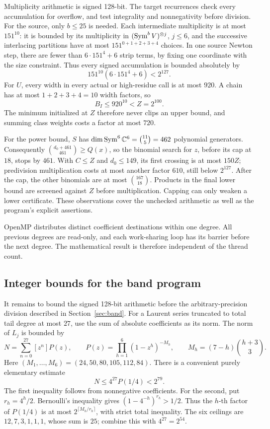 Multiplicity arithmetic is signed 128-bit. The target recurrences check
every accumulation for overflow, and test integrality and nonnegativity
before division. For the source, only \(b\le25\) is needed.
Each intermediate multiplicity is at most \(151^{10}\): it is bounded
by its multiplicity in \((\operatorname{Sym}^b V)^{\otimes j}\), \(j\le6\), and the
successive interlacing partitions have at most
\(151^{0+1+2+3+4}\) choices. In one source Newton step, there are fewer
than \(6\cdot151^4+6\) strip terms, by fixing one coordinate with the
size constraint. Thus every signed accumulation is bounded absolutely by
\[
                   151^{10}(6\cdot151^4+6)<2^{127}.
\]
For \(U\), every width in every actual or high-residue call is at most
\(920\). A chain has at most \(1+2+3+4=10\) width factors, so
\[
                      B_I\le920^{10}<Z=2^{100}.
\]
The minimum initialized at \(Z\) therefore never clips an upper bound,
and summing class weights costs a factor at most \(720\).

For the power bound, \(S\) has
\(\dim\operatorname{Sym}^6\mathbb C^6=\binom{11}{5}=462\) polynomial generators.
Consequently \(\binom{d_0+461}{461}\ge Q(x)\), so the binomial search
for \(z\), before its cap at \(18\), stops by \(461\).
With \(C\le Z\) and \(d_0\le149\), its first crossing is at most
\(150Z\); predivision multiplication costs at most another factor \(610\),
still below \(2^{127}\). After the cap, the other binomials are at most
\(\binom{167}{18}\). Products in the final lower bound are screened
against \(Z\) before multiplication. Capping can only weaken a lower
certificate. These observations cover the unchecked arithmetic as well
as the program's explicit assertions.

OpenMP distributes distinct coefficient destinations within one degree.
All previous degrees are read-only, and each work-sharing loop has its
barrier before the next degree. The mathematical result is therefore
independent of the thread count.

\subsection{Integer bounds for the band program}
It remains to bound the signed 128-bit arithmetic before the
arbitrary-precision division described in Section~\ref{sec:band}.
For a Laurent series truncated to total tail degree at most \(27\),
use the sum of absolute coefficients as its norm.
The norm of \(L_j\) is bounded by
\[
 N=\sum_{n=0}^{27}[z^n]P(z),\qquad
 P(z)=\prod_{h=1}^6(1-z^h)^{-M_h},\qquad
 M_h=(7-h)\binom{h+3}{3}.
\]
Here \((M_1,\ldots,M_6)=(24,50,80,105,112,84)\).
There is a convenient purely elementary estimate
\begin{equation}\label{eq:normbound}
                         N\le4^{27}P(1/4)<2^{79}.
\end{equation}
The first inequality follows from nonnegative coefficients.
For the second, put \(r_h=4^h/2\). Bernoulli's inequality gives
\((1-4^{-h})^{r_h}>1/2\).
Thus the \(h\)-th factor of \(P(1/4)\) is at most
\(2^{\lceil M_h/r_h\rceil}\), with strict total inequality.
The six ceilings are \(12,7,3,1,1,1\), whose sum is \(25\);
combine this with \(4^{27}=2^{54}\).


